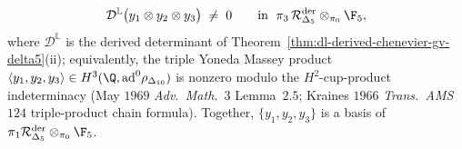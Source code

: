 \begin{theorem}
\begin{equation}
\label{eq:yi-independence}
 \mathcal D^{\mathbb L}\bigl(y_1\otimes y_2\otimes y_3\bigr)
 \;\ne\; 0
 \qquad\text{in }\;\pi_3\,\mathcal R^{\mathrm{der}}_{\Delta_5}\otimes_{\pi_0}\F_5,
\end{equation}
where $\mathcal D^{\mathbb L}$ is the derived determinant of
Theorem~\ref{thm:dl-derived-chenevier-gv-delta5}(ii); equivalently,
the triple Yoneda Massey product
$\langle y_1, y_2, y_3\rangle\in H^3(\Q,\mathrm{ad}^0\rho_{\Delta_{10}})$
is nonzero modulo the $H^2$-cup-product indeterminacy
(May $1969$ \emph{Adv.\ Math.}~$3$ Lemma~$2.5$; Kraines $1966$
\emph{Trans.\ AMS}~$124$ triple-product chain formula). Together,
$\{y_1, y_2, y_3\}$ is a basis of
$\pi_1\mathcal R^{\mathrm{der}}_{\Delta_5}\otimes_{\pi_0}\F_5$.
\end{theorem}

